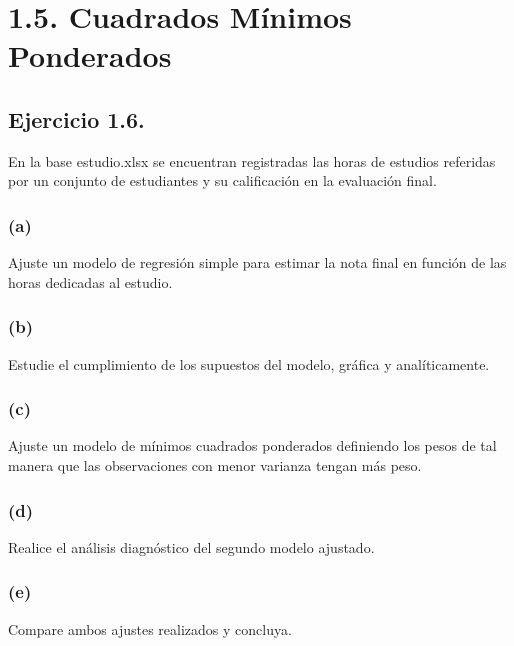 \documentclass[
]{article}
\begin{document}
\hypertarget{cuadrados-muxednimos-ponderados}{%
\section{\texorpdfstring{{1.5. Cuadrados Mínimos
Ponderados}}{1.5. Cuadrados Mínimos Ponderados}}\label{cuadrados-muxednimos-ponderados}}

\hypertarget{ejercicio-1.6.}{%
\subsection{Ejercicio 1.6.}\label{ejercicio-1.6.}}

En la base estudio.xlsx se encuentran registradas las horas de estudios
referidas por un conjunto de estudiantes y su calificación en la
evaluación final.

\hypertarget{a-5}{%
\subsubsection{(a)}\label{a-5}}

Ajuste un modelo de regresión simple para estimar la nota final en
función de las horas dedicadas al estudio.

\hypertarget{b-5}{%
\subsubsection{(b)}\label{b-5}}

Estudie el cumplimiento de los supuestos del modelo, gráfica y
analíticamente.

\hypertarget{c-5}{%
\subsubsection{(c)}\label{c-5}}

Ajuste un modelo de mínimos cuadrados ponderados definiendo los pesos de
tal manera que las observaciones con menor varianza tengan más peso.

\hypertarget{d-4}{%
\subsubsection{(d)}\label{d-4}}

Realice el análisis diagnóstico del segundo modelo ajustado.

\hypertarget{e-3}{%
\subsubsection{(e)}\label{e-3}}

Compare ambos ajustes realizados y concluya.
\end{document}
